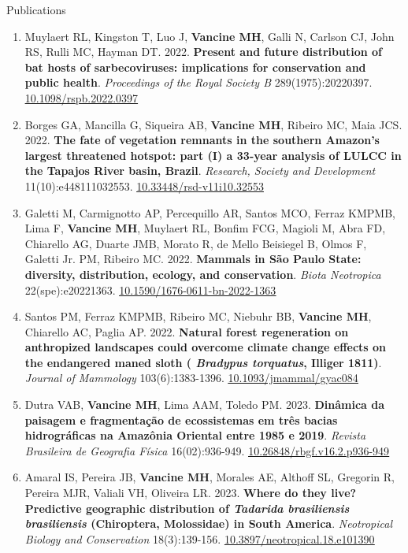 \documentclass{resume}
\begin{document}
\begin{rSection}{Publications}
\begin{enumerate}
\item Muylaert RL, Kingston T, Luo J, {\bf Vancine MH}, Galli N, Carlson CJ, John RS, Rulli MC, Hayman DT. 2022. {\bf Present and future distribution of bat hosts of sarbecoviruses: implications for conservation and public health}. {\it Proceedings of the Royal Society B} 289(1975):20220397. \href{https://doi.org/10.1098/rspb.2022.0397}{\underline{10.1098/rspb.2022.0397}}

\item Borges GA, Mancilla G, Siqueira AB, {\bf Vancine MH}, Ribeiro MC, Maia JCS. 2022. {\bf The fate of vegetation remnants in the southern Amazon’s largest threatened hotspot: part (I) a 33-year analysis of LULCC in the Tapajos River basin, Brazil}. {\it Research, Society and Development} 11(10):e448111032553. \href{https://doi.org/10.33448/rsd-v11i10.32553}{\underline{10.33448/rsd-v11i10.32553}}

\item Galetti M, Carmignotto AP, Percequillo AR, Santos MCO, Ferraz KMPMB, Lima F, {\bf Vancine MH}, Muylaert RL, Bonfim FCG, Magioli M, Abra FD, Chiarello AG, Duarte JMB, Morato R, de Mello Beisiegel B, Olmos F, Galetti Jr. PM, Ribeiro MC. 2022. {\bf Mammals in São Paulo State: diversity, distribution, ecology, and conservation}. {\it Biota Neotropica} 22(spe):e20221363. \href{https://doi.org/10.1590/1676-0611-bn-2022-1363}{\underline{10.1590/1676-0611-bn-2022-1363}}

\item Santos PM, Ferraz KMPMB, Ribeiro MC, Niebuhr BB, {\bf Vancine MH}, Chiarello AC, Paglia AP. 2022. {\bf Natural forest regeneration on anthropized landscapes could overcome climate change effects on the endangered maned sloth (\textbf{\textit{ Bradypus torquatus}}, Illiger 1811)}. {\it Journal of Mammology} 103(6):1383-1396. \href{https://doi.org/10.1093/jmammal/gyac084}{\underline{10.1093/jmammal/gyac084}}

\item Dutra VAB, {\bf Vancine MH}, Lima AAM, Toledo PM. 2023. {\bf Dinâmica da paisagem e fragmentação de ecossistemas em três bacias hidrográficas na Amazônia Oriental entre 1985 e 2019}. {\it Revista Brasileira de Geografia Física} 16(02):936-949. \href{https://doi.org/10.26848/rbgf.v16.2.p936-949}{\underline{10.26848/rbgf.v16.2.p936-949}}

\item Amaral IS, Pereira JB, {\bf Vancine MH}, Morales AE, Althoff SL, Gregorin R, Pereira MJR, Valiali VH, Oliveira LR. 2023. {\bf Where do they live? Predictive geographic distribution of \textbf{\textit{Tadarida brasiliensis brasiliensis}} (Chiroptera, Molossidae) in South America}. {\it Neotropical Biology and Conservation} 18(3):139-156. \href{https://doi.org/10.3897/neotropical.18.e101390}{\underline{10.3897/neotropical.18.e101390}}


\end{enumerate}
\end{rSection}
\end{document}
